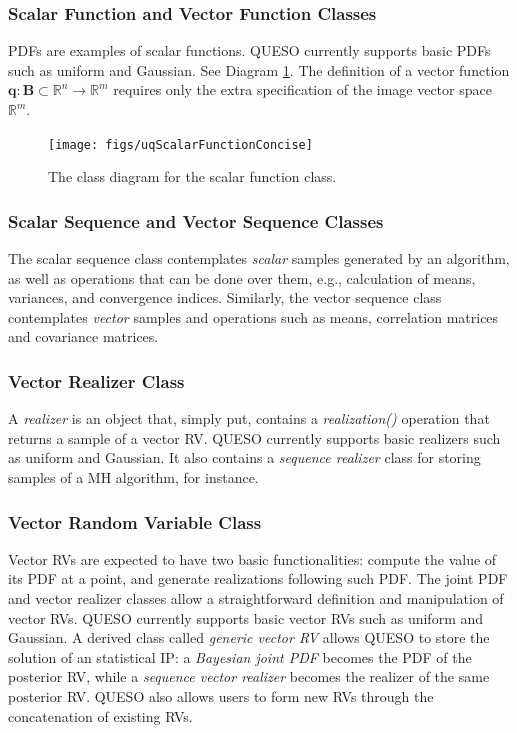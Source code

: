 \subsubsection{Scalar Function and Vector Function Classes}
%
PDFs are examples of scalar functions.
QUESO currently supports basic PDFs such as uniform and Gaussian.
See Diagram \ref{fig-scalar-function-class}.
The definition of a vector function $\mathbf{q}:\mathbf{B}\subset\mathbb{R}^n\rightarrow\mathbb{R}^m$ requires only the extra specification of the image vector space $\mathbb{R}^m$.


\begin{figure}[!h]
\centerline{
\texttt{[image: figs/uqScalarFunctionConcise]}
}
\caption{
The class diagram for the scalar function class.
}
\label{fig-scalar-function-class}
\end{figure}

\subsubsection{Scalar Sequence and Vector Sequence Classes}
%
The scalar sequence class contemplates {\it scalar} samples generated by an algorithm, as well as operations that can
be done over them, e.g., calculation of means, variances, and convergence indices.
Similarly, the vector sequence class contemplates {\it vector} samples and operations such as means, correlation matrices and covariance matrices.



\subsubsection{Vector Realizer Class}
%
A {\it realizer} is an object that, simply put, contains a {\it realization()} operation that returns a sample of a vector RV.
QUESO currently supports basic realizers such as uniform and Gaussian.
It also contains a {\it sequence realizer} class for storing samples of a MH algorithm, for instance.



\subsubsection{Vector Random Variable Class}
%
Vector RVs are expected to have two basic functionalities:
compute the value of its PDF at a point, and generate realizations following such PDF.
The joint PDF and vector realizer classes allow a straightforward definition and manipulation of vector RVs.
QUESO currently supports basic vector RVs such as uniform and Gaussian.
A derived class called {\it generic vector RV} allows QUESO to store the solution of an statistical IP:
a {\it Bayesian joint PDF} becomes the PDF of the posterior RV, while a {\it sequence vector realizer} becomes the realizer of the same posterior RV.
QUESO also allows users to form new RVs through the concatenation of existing RVs.


